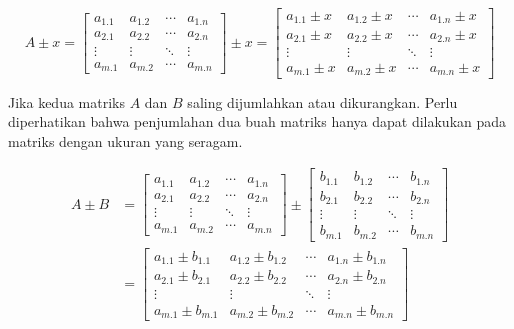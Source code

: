 \documentclass[
]{book}
\theoremstyle{definition}
\theoremstyle{definition}
\theoremstyle{definition}
\theoremstyle{definition}
\theoremstyle{remark}
\begin{document}
\begin{equation}
A \pm x = \begin{bmatrix}
       a_{1.1} & a_{1.2} &\cdots& a_{1.n}           \\[0.3em]
       a_{2.1} & a_{2.2} &\cdots& a_{2.n}           \\[0.3em]
       \vdots  & \vdots  &\ddots& \vdots            \\[0.3em]
       a_{m.1} & a_{m.2} &\cdots& a_{m.n}
     \end{bmatrix}
\pm x = \begin{bmatrix}
      a_{1.1}\pm x & a_{1.2}\pm x &\cdots& a_{1.n}\pm x           \\[0.3em]
      a_{2.1}\pm x & a_{2.2}\pm x &\cdots& a_{2.n}\pm x           \\[0.3em]
      \vdots  & \vdots  &\ddots& \vdots            \\[0.3em]
      a_{m.1}\pm x & a_{m.2}\pm x &\cdots& a_{m.n}\pm x
     \end{bmatrix}
  \label{eq:addmatrik}
\end{equation}

Jika kedua matriks \(A\) dan \(B\) saling dijumlahkan atau dikurangkan. Perlu diperhatikan bahwa penjumlahan dua buah matriks hanya dapat dilakukan pada matriks dengan ukuran yang seragam.

\begin{equation}
\begin{split}
A \pm B & = \begin{bmatrix}
       a_{1.1} & a_{1.2} &\cdots& a_{1.n}           \\[0.3em]
       a_{2.1} & a_{2.2} &\cdots& a_{2.n}           \\[0.3em]
       \vdots  & \vdots  &\ddots& \vdots            \\[0.3em]
       a_{m.1} & a_{m.2} &\cdots& a_{m.n}
     \end{bmatrix}
\pm \begin{bmatrix}
      b_{1.1} & b_{1.2} &\cdots& b_{1.n}           \\[0.3em]
      b_{2.1} & b_{2.2} &\cdots& b_{2.n}           \\[0.3em]
      \vdots  & \vdots  &\ddots& \vdots            \\[0.3em]
      b_{m.1} & b_{m.2} &\cdots& b_{m.n}
     \end{bmatrix} \\
& = \begin{bmatrix}
       a_{1.1}\pm b_{1.1} & a_{1.2}\pm b_{1.2} &\cdots& a_{1.n}\pm b_{1.n}           \\[0.3em]
       a_{2.1}\pm b_{2.1} & a_{2.2}\pm b_{2.2} &\cdots& a_{2.n}\pm b_{2.n}           \\[0.3em]
       \vdots  & \vdots  &\ddots& \vdots            \\[0.3em]
       a_{m.1}\pm b_{m.1} & a_{m.2}\pm b_{m.2} &\cdots& a_{m.n}\pm b_{m.n}
     \end{bmatrix}
\end{split}
  \label{eq:addmatrik2}
\end{equation}
\end{document}

